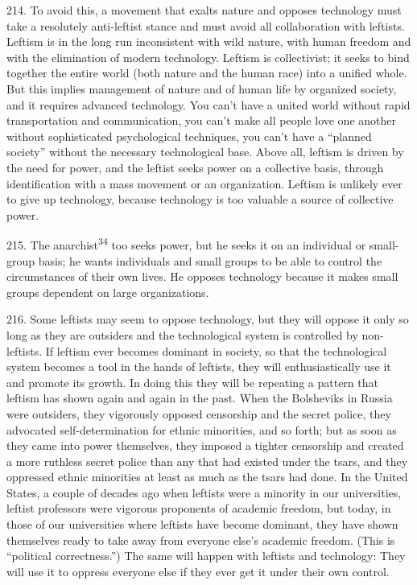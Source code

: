 \documentclass{article}
\begin{document}
214.  To avoid this, a movement that exalts nature and opposes technology must take a resolutely 
anti-leftist  stance  and  must  avoid  all  collaboration  with  leftists.   Leftism  is  in  the  long  run  
inconsistent with wild nature, with human freedom and with the elimination of modern 
technology.  Leftism is collectivist; it seeks to bind together the entire world (both nature and the 
human race) into a unified whole.  But this implies management of nature and of human life by 
organized society, and it requires advanced technology.  You can’t have a united world without 
rapid  transportation  and  communication,  you  can’t  make  all  people  love  one  another  without  
sophisticated psychological techniques, you can’t have a “planned society” without the necessary 
technological base.  Above all, leftism is driven by the need for power, and the leftist seeks power 
on a collective basis, through identification with a mass movement or an organization.  Leftism is 
unlikely  ever  to  give  up  technology,  because  technology  is  too  valuable  a  source  of  collective  
power. \vspace{\baselineskip}

215.  The anarchist\textsuperscript{34} too seeks power, but he seeks it on an individual or small-group basis; he 
wants individuals and small groups to be able to control the circumstances of their own lives.  He 
opposes technology because it makes small groups dependent on large organizations. \vspace{\baselineskip}

216.  Some leftists may seem to oppose technology, but they will oppose it only so long as they 
are outsiders and the technological system is controlled by non-leftists.  If leftism ever becomes 
dominant in society, so that the technological system becomes a tool in the hands of leftists, they 
will enthusiastically use it and promote its growth.  In doing this they will be repeating a pattern 
that leftism has shown again and again in the past.  When the Bolsheviks in Russia were outsiders, 
they vigorously opposed censorship and the secret police, they advocated self-determination for 
ethnic minorities, and so forth; but as soon as they came into power themselves, they imposed a 
tighter  censorship  and  created  a  more  ruthless  secret  police  than  any  that  had  existed  under  the  
tsars, and they oppressed ethnic minorities at least as much as the tsars had done.  In the United 
States, a couple of decades ago when leftists were a minority in our universities, leftist professors 
were  vigorous  proponents  of  academic  freedom,  but  today,  in  those  of  our  universities  where  
leftists  have  become  dominant,  they  have  shown  themselves  ready  to  take  away  from  everyone  
else’s academic freedom.  (This is “political correctness.”) The same will happen with leftists and 
technology: They will use it to oppress everyone else if they ever get it under their own control. \vspace{\baselineskip}
\end{document}
